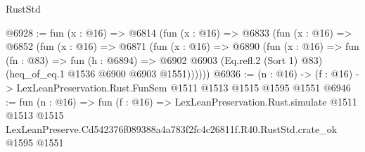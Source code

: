 \begin{lexlean}{RustStd}
\begin{coremodule}
@6928 := fun (x : @16) =>
  @6814
    (fun (x : @16) =>
    @6833
      (fun (x : @16) =>
      @6852
        (fun (x : @16) =>
        @6871
          (fun (x : @16) =>
          @6890
            (fun (x : @16) =>
            fun (fn : @83) =>
            fun (h : @6894) =>
            @6902 @6903 (Eq.refl.{2} (Sort 1) @83) (heq_of_eq.{1} @1536 @6900 @6903 @1551))))))
@6936 := (n : @16) -> (f : @16) -> LexLeanPreservation.Rust.FunSem @1511 @1513 @1515 @1595 @1551
@6946 := fun (n : @16) =>
  fun (f : @16) =>
  LexLeanPreservation.Rust.simulate
    @1511
    @1513
    @1515
    LexLeanPreserve.Cd542376f089388a4a783f2fc4c26811f.R40.RustStd.crate_ok
    @1595
    @1551
\end{coremodule}
\end{lexlean}
